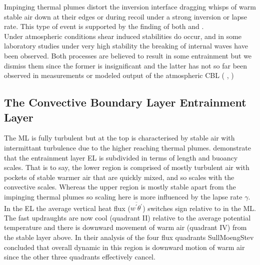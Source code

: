Impinging thermal plumes distort the inversion interface dragging whisps of warm stable air down
at their edges or during recoil under a strong inversion or lapse rate. This type of event is supported 
by the finding  of both \citeauthor{SullMoengStev} \cite{SullMoengStev} and \citeauthor{Traum11} \cite{Traum11}.\\

Under atmospheric conditions shear induced stabilities do occur, and in some laboratory studies 
under very high stability the breaking of internal waves have been observed.  Both processes are 
believed to result in some entrainment but we dismiss them since the former is insignificant 
 and the latter has not so far been observed in measurements or modeled output of the 
atmospheric \acs{CBL} (\citeauthor{Traum11} \cite{Traum11}, \citeauthor{SullMoengStev} \cite{SullMoengStev})

\subsection{The Convective Boundary Layer Entrainment Layer}
\label{subsec:}

The \acs{ML} is fully turbulent but at the top is characterised by stable air with intermittant turbulence due
to the higher reaching thermal plumes. \citeauthor{GarciaMellado} demonstrate that the entrainment layer \acs{EL}
 is subdivided in terms of length and buoancy scales.  That is to say, the lower region is comprised of mostly
turbulent air with pockets of stable warmer air that are quickly mixed, and so scales with the convective scales.
Whereas the upper region is mostly stable apart from the impinging thermal plumes so scaling here is more influenced
by the lapse rate $\gamma$.\\  

In the \acs{EL} the average vertical heat flux ($\overline{w^{'}\theta^{'}}$) switches sign relative to in the \acs{ML}.
The fast updraughts are now cool (quadrant II) relative to the average potential temperature and there is downward movement of 
warm air (quadrant IV) from the stable layer above.  In their analysis of the four flux quadrants \acs{SullMoengStev}
concluded that overall dynamic in this region is downward motion of warm air since the other three quadrants effectively 
cancel.\\

